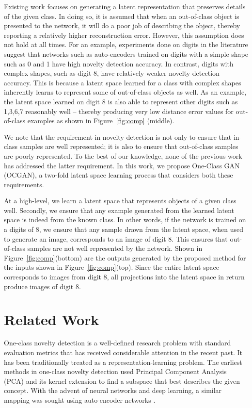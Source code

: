 \documentclass[10pt,twocolumn,letterpaper]{article}
\begin{document}
Existing work focuses on generating a latent representation that preserves details of the given class. In doing so, it is assumed that when an out-of-class object is presented to the network, it will do a poor job of describing the object, thereby reporting a relatively higher reconstruction error. However, this assumption does not hold at all times. For an example, experiments done on digits in the literature \cite{GPND,AND} suggest that networks such as auto-encoders trained on digits with a simple shape such as 0 and 1 have high novelty detection accuracy. In contrast, digits with complex shapes, such as digit 8, have relatively weaker novelty detection accuracy. This is because a latent space learned for a class with complex shapes inherently learns to represent some of out-of-class objects as well. As an example, the latent space learned on digit 8 is also able to represent other digits such as 1,3,6,7 reasonably well -- thereby producing very low distance error values for out-of-class examples as shown in Figure~\ref{fig:comp} (middle). 

We note that the requirement in novelty detection is not only to ensure that in-class samples are well represented; it is also to ensure that out-of-class samples are poorly represented. To the best of our knowledge, none of the previous work has addressed the latter requirement. In this work, we propose One-Class GAN (OCGAN), a two-fold latent space learning process that considers both these requirements. 

At a high-level, we learn a latent space that represents objects of a given class well. Secondly, we ensure that any example generated from the learned latent space is indeed from the known class. In other words, if the network is trained on a digits of 8, we ensure that any sample drawn from the latent space, when used to generate an image, corresponds to an image of digit 8. This ensures that out-of-class samples are not well represented by the network.  Shown in Figure~\ref{fig:comp}(bottom) are the outputs generated by the proposed method for the inputs shown in Figure~\ref{fig:comp}(top). Since the entire latent space corresponds to images from digit 8, all projections into the latent space in return produce images of digit 8. 









\section{Related Work}
 One-class novelty detection is a well-defined research problem with standard evaluation metrics that has received considerable attention in the recent past. It has been traditionally treated as a representation-learning problem. The earliest methods in one-class novelty detection used Principal Component Analysis (PCA) \cite{Bishop:2006:PRM:1162264} and its kernel extension \cite{HOFFMANN2007863} to find a subspace that best describes the given concept. With the advent of neural networks and deep learning, a similar mapping was sought using auto-encoder networks \cite{MNISTAUTO}. 
\end{document}
